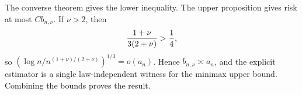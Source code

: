 The converse theorem gives the lower inequality.  The upper proposition gives risk at most \(Cb_{n,\nu}\).  If \(\nu>2\), then
\[
 {1+\nu\over3(2+\nu)}>{1\over4},
\]
so \((\log n/n^{(1+\nu)/(2+\nu)})^{1/3}=o(a_n)\).  Hence \(b_{n,\nu}\asymp a_n\), and the explicit estimator is a single law-independent witness for the minimax upper bound.  Combining the bounds proves the result.